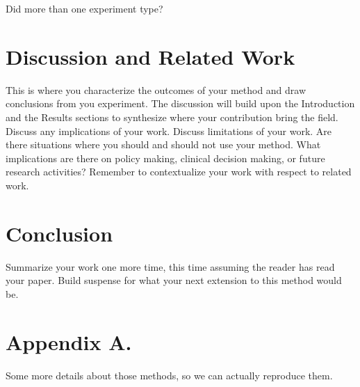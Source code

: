 \documentclass[twoside,11pt]{article}
\begin{document}
Did more than one experiment type?

\section{Discussion and Related Work} 

This is where you characterize the outcomes of your method and draw conclusions from you experiment.
The discussion will build upon the Introduction and the Results sections to synthesize where your contribution bring the field. Discuss any implications of your work. 
Discuss limitations of your work.
Are there situations where you should and should not use your method.
What implications are there on policy making, clinical decision making, or future research activities?
Remember to contextualize your work with respect to related work.

\section{Conclusion} 
Summarize your work one more time, this time assuming the reader has read your paper.
Build suspense for what your next extension to this method would be.




\appendix
\section*{Appendix A.}
Some more details about those methods, so we can actually reproduce them.
\end{document}

